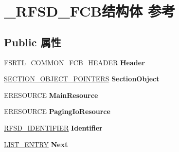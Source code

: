 \hypertarget{struct___r_f_s_d___f_c_b}{}\section{\+\_\+\+R\+F\+S\+D\+\_\+\+F\+C\+B结构体 参考}
\label{struct___r_f_s_d___f_c_b}
\subsection*{Public 属性}
\begin{DoxyCompactItemize}
\item 
\mbox{\label{struct___r_f_s_d___f_c_b_a9c95943b6a45835a5bd4283219acd35a}} 
\hyperlink{struct___f_s_r_t_l___c_o_m_m_o_n___f_c_b___h_e_a_d_e_r}{F\+S\+R\+T\+L\+\_\+\+C\+O\+M\+M\+O\+N\+\_\+\+F\+C\+B\+\_\+\+H\+E\+A\+D\+ER} {\bfseries Header}
\item 
\mbox{\label{struct___r_f_s_d___f_c_b_a57010cb49cc12838b211671259718362}} 
\hyperlink{struct___s_e_c_t_i_o_n___o_b_j_e_c_t___p_o_i_n_t_e_r_s}{S\+E\+C\+T\+I\+O\+N\+\_\+\+O\+B\+J\+E\+C\+T\+\_\+\+P\+O\+I\+N\+T\+E\+RS} {\bfseries Section\+Object}
\item 
\mbox{\label{struct___r_f_s_d___f_c_b_aa66119513c3f7280cf189a7332100368}} 
E\+R\+E\+S\+O\+U\+R\+CE {\bfseries Main\+Resource}
\item 
\mbox{\label{struct___r_f_s_d___f_c_b_ad08b675716ecec5077491588ef3f6710}} 
E\+R\+E\+S\+O\+U\+R\+CE {\bfseries Paging\+Io\+Resource}
\item 
\mbox{\label{struct___r_f_s_d___f_c_b_afb340678441ee461dd56c2040d86e1db}} 
\hyperlink{struct___r_f_s_d___i_d_e_n_t_i_f_i_e_r}{R\+F\+S\+D\+\_\+\+I\+D\+E\+N\+T\+I\+F\+I\+ER} {\bfseries Identifier}
\item 
\mbox{\label{struct___r_f_s_d___f_c_b_a6f7cbab5e467c127c6f9578a748f820d}} 
\hyperlink{struct___l_i_s_t___e_n_t_r_y}{L\+I\+S\+T\+\_\+\+E\+N\+T\+RY} {\bfseries Next}
\item 
\mbox{\label{struct___r_f_s_d___f_c_b_a284611228afe3ce608925347ee1a781f}} 

\end{DoxyCompactItemize}
